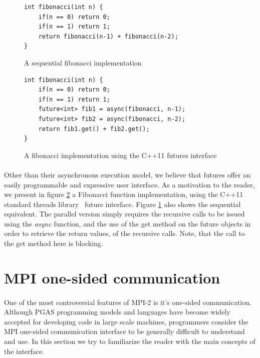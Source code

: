 \begin{figure}[!ht]
\begin{lstlisting}
int	fibonacci(int n) {
	if(n == 0) return 0;
	if(n == 1) return 1;
	return fibonacci(n-1) + fibonacci(n-2);
}
\end{lstlisting}
\caption{A sequential fibonacci implementation}
\label{lst:fib_seq}
\end{figure}

\begin{figure}[!ht]
\begin{lstlisting}
int	fibonacci(int n) {
	if(n == 0) return 0;
	if(n == 1) return 1;
	future<int> fib1 = async(fibonacci, n-1);
	future<int> fib2 = async(fibonacci, n-2);
	return fib1.get() + fib2.get();
}
\end{lstlisting}
\caption{A fibonacci implementation using the C++11 futures interface}
\label{lst:fib_futures}
\end{figure}

\paragraph{}
Other than their asynchronous execution model, we believe that futures offer an easily programmable and expressive 
user interface.
As a motivation to the reader, we present in figure \ref{lst:fib_futures} a
Fibonacci function implementation, using the C++11 standard threads library~\cite{CPP:Threads} future interface.  Figure
\ref{lst:fib_seq} also shows the sequential equivalent.  The parallel version simply requires the recursive calls 
to be issued using the \emph{async} function, and the use of the get method on the future objects in order to retrieve
the return values, of the recursive calls.  Note, that the call to the get method here is blocking.  


\section{MPI one-sided communication}
\label{sect:mpi-one-sided}
\paragraph{}
One of the most controversial features of MPI-2 is it's one-sided communication.  Although PGAS programming
models and languages have become widely accepted for developing code in large scale machines, programmers
consider the MPI one-sided communication interface to be generally difficult to understand and use.  In this
section we try to familiarize the reader with the main concepts of the interface.  

